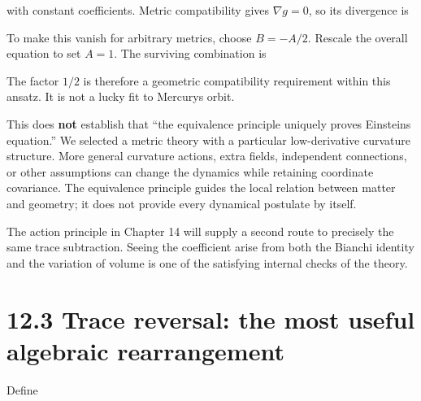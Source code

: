\documentclass[
  11pt,
  letterpaper,
  oneside,
  openany]{scrbook}
\begin{document}
with constant coefficients. Metric compatibility gives \(\nabla g=0\),
so its divergence is

\begin{center}
\begingroup
{}
\ifdim\wd\grmathbox>\linewidth
\resizebox{\linewidth}{!}{\usebox{\grmathbox}}
\else\usebox{\grmathbox}\fi
\endgroup
\end{center}

To make this vanish for arbitrary metrics, choose \(B=-A/2\). Rescale
the overall equation to set \(A=1\). The surviving combination is

\begin{center}
\begingroup
{}
\ifdim\wd\grmathbox>\linewidth
\resizebox{\linewidth}{!}{\usebox{\grmathbox}}
\else\usebox{\grmathbox}\fi
\endgroup
\end{center}

The factor \(1/2\) is therefore a geometric compatibility requirement
within this ansatz. It is not a lucky fit to Mercury\textquotesingle s
orbit.

This does \textbf{not} establish that ``the equivalence principle
uniquely proves Einstein\textquotesingle s equation.'' We selected a
metric theory with a particular low-derivative curvature structure. More
general curvature actions, extra fields, independent connections, or
other assumptions can change the dynamics while retaining coordinate
covariance. The equivalence principle guides the local relation between
matter and geometry; it does not provide every dynamical postulate by
itself.

The action principle in Chapter 14 will supply a second route to
precisely the same trace subtraction. Seeing the coefficient arise from
both the Bianchi identity and the variation of volume is one of the
satisfying internal checks of the theory.

\hypertarget{trace-reversal-the-most-useful-algebraic-rearrangement}{%
\section{12.3 Trace reversal: the most useful algebraic
rearrangement}\label{trace-reversal-the-most-useful-algebraic-rearrangement}}

Define

\begin{center}
\begingroup
{}
\ifdim\wd\grmathbox>\linewidth
\resizebox{\linewidth}{!}{\usebox{\grmathbox}}
\else\usebox{\grmathbox}\fi
\endgroup
\end{center}
\end{document}
